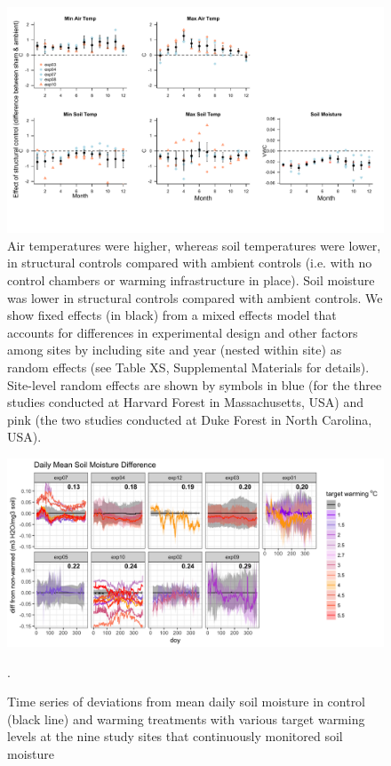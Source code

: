 \documentclass{article}
\begin{document}
 \begin{figure}[p]
\centering
 \includegraphics{../Analyses/figures/ShamVSAmbient_all.pdf}  
 \caption{Air temperatures were higher, whereas soil temperatures were lower, in structural controls compared with ambient controls (i.e. with no control chambers or warming infrastructure in place). Soil moisture was lower in structural controls compared with ambient controls. We show fixed effects (in black) from a mixed effects model that accounts for differences in experimental design and other factors among sites by including site and year (nested within site) as random effects (see Table XS, Supplemental Materials for details). Site-level random effects are shown by symbols in blue (for the three studies conducted at Harvard Forest in Massachusetts, USA) and pink (the two studies conducted at Duke Forest in North Carolina, USA).}
 \label{fig:shamamb}
 \end{figure}
\clearpage
 \begin{figure}[h]
    \centering
 \includegraphics{../Analyses/figures/Exploratory_TimeSeries_SoilMoist_Deviation.png}  
 \caption{Time series of deviations from mean daily soil moisture in control (black line) and warming treatments with various target warming levels at the nine study sites that continuously monitored soil moisture}.%
 \label{fig:mois}
 \end{figure}
\end{document}
